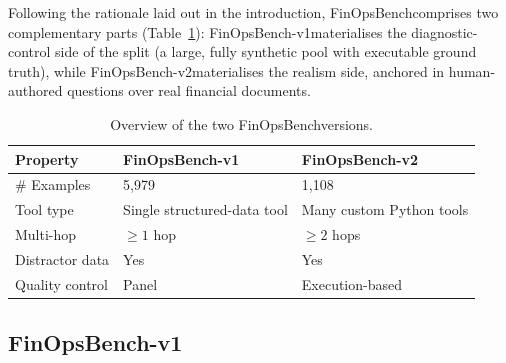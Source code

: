 \documentclass[11pt]{article}
\newcommand{\datasetname}{FinOpsBench}\xspace
\newcommand{\synthsubset}{FinOpsBench-v1}\xspace
\newcommand{\groundedfinqa}{FinOpsBench-v2}\xspace
\begin{document}
Following the rationale laid out in the introduction, \datasetname comprises two complementary parts (Table~\ref{tab:dataset_overview}): \synthsubset materialises the diagnostic-control side of the split (a large, fully synthetic pool with executable ground truth), while \groundedfinqa materialises the realism side, anchored in human-authored questions over real financial documents.

\begin{table}[t]
\centering
\footnotesize
\setlength{\tabcolsep}{3pt}
\renewcommand{\arraystretch}{1.1}
\begin{tabularx}{\columnwidth}{@{}l X X@{}}
\toprule
\textbf{Property} & \textbf{\synthsubset} & \textbf{\groundedfinqa} \\
\midrule
\# Examples & 5,979 & 1,108 \\
Tool type & Single structured-data tool & Many custom Python tools \\
Multi-hop & $\geq 1$ hop & $\geq 2$ hops \\
Distractor data & Yes & Yes \\
Quality control & Panel & Execution-based \\
\bottomrule
\end{tabularx}
\caption{Overview of the two \datasetname versions.}
\label{tab:dataset_overview}
\end{table}

\subsection{\synthsubset}
\label{sec:synthsql}
\end{document}
